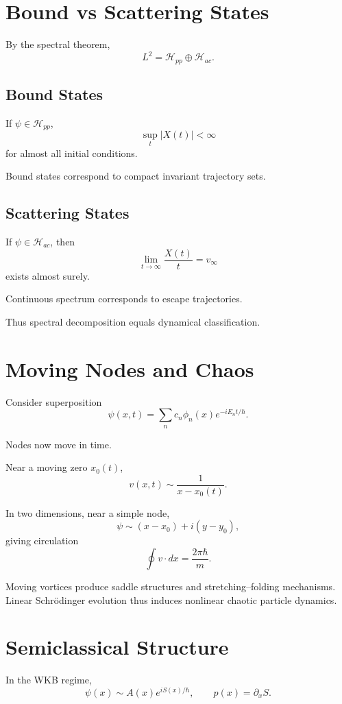 \documentclass[11pt]{article}
\theoremstyle{plain}
\theoremstyle{definition}
\begin{document}
\section{Bound vs Scattering States}

By the spectral theorem,
\[
L^2 = \mathcal H_{pp} \oplus \mathcal H_{ac}.
\]

\subsection{Bound States}

If $\psi \in \mathcal H_{pp}$,
\[
\sup_t |X(t)| < \infty
\]
for almost all initial conditions.

Bound states correspond to compact invariant trajectory sets.

\subsection{Scattering States}

If $\psi \in \mathcal H_{ac}$, then
\[
\lim_{t\to\infty} \frac{X(t)}{t} = v_\infty
\]
exists almost surely.

Continuous spectrum corresponds to escape trajectories.

Thus spectral decomposition equals dynamical classification.

\section{Moving Nodes and Chaos}

Consider superposition
\[
\psi(x,t)=\sum_{n} c_n \phi_n(x)e^{-iE_nt/\hbar}.
\]

Nodes now move in time.

Near a moving zero $x_0(t)$,
\[
v(x,t) \sim \frac{1}{x-x_0(t)}.
\]

In two dimensions, near a simple node,
\[
\psi \sim (x-x_0) + i(y-y_0),
\]
giving circulation
\[
\oint v\cdot dx = \frac{2\pi\hbar}{m}.
\]

Moving vortices produce saddle structures and stretching–folding mechanisms.
Linear Schrödinger evolution thus induces nonlinear chaotic particle dynamics.

\section{Semiclassical Structure}

In the WKB regime,
\[
\psi(x) \sim A(x)e^{iS(x)/\hbar},
\qquad
p(x)=\partial_x S.
\]
\end{document}
